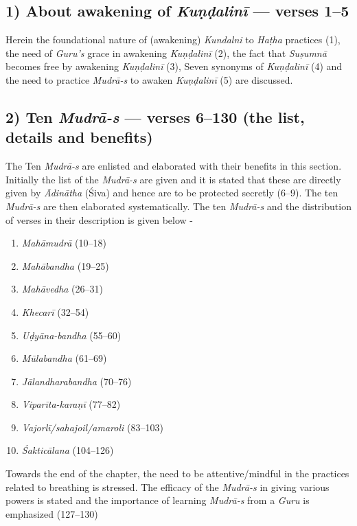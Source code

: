 \subsection*{1) About awakening of \textit{Kuṇḍalinī}  --- verses 1--5}

Herein the foundational nature of (awakening) \textit{Kundalni} to \textit{Haṭha} practices (1), the need of \textit{Guru’s} grace in awakening \textit{Kuṇḍalinī}  (2), the fact that \textit{Suṣumnā} becomes free by awakening \textit{Kuṇḍalinī}  (3), Seven synonyms of \textit{Kuṇḍalinī}  (4) and the need to practice \textit{Mudrā-s} to awaken \textit{Kuṇḍalinī}  (5) are discussed. 

\subsection*{2) Ten \textit{Mudrā-s} --- verses 6--130 (the list, details and benefits)}

The Ten \textit{Mudrā-s} are enlisted and elaborated with their benefits in this section. Initially the list of the \textit{Mudrā-s} are given and it is stated that these are directly given by \textit{Ādinātha} (Śiva) and hence are to be protected secretly (6--9). The ten \textit{Mudrā-s} are then elaborated systematically. The ten  \textit{Mudrā-s}  and the distribution of verses in their description is given below -  

\begin{enumerate}
\item \textit{Mahāmudrā} (10--18)
\item \textit{Mahābandha} (19--25)
\item \textit{Mahāvedha} (26--31)
\item \textit{Khecarī} (32--54)
\item \textit{Uḍyāna-bandha} (55--60)
\item \textit{Mūlabandha} (61--69)
\item \textit{Jālandharabandha} (70--76)
\item \textit{Viparīta-karaṇī} (77--82)
\item \textit{Vajorlī/sahajoil/amaroli} (83--103)
\item \textit{Śakticālana} (104--126)
\end{enumerate}

Towards the end of the chapter, the need to be attentive/mindful in the practices related to breathing is stressed. The efficacy of the \textit{Mudrā-s} in giving various powers is stated and the importance of learning \textit{Mudrā-s} from a \textit{Guru} is emphasized (127--130) 

